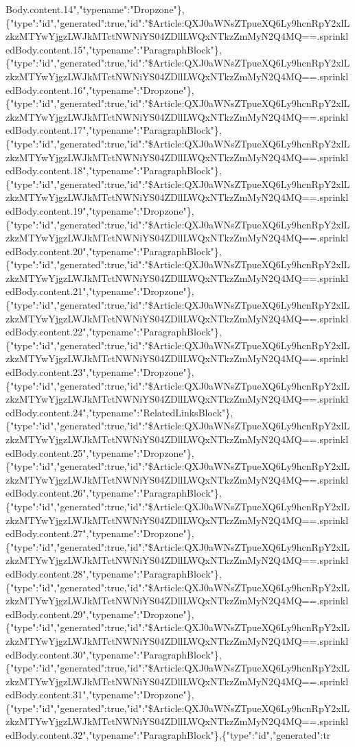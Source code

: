 Body.content.14","typename":"Dropzone"\},\{"type":"id","generated":true,"id":"\$Article:QXJ0aWNsZTpueXQ6Ly9hcnRpY2xlLzkzMTYwYjgzLWJkMTctNWNiYS04ZDllLWQxNTkzZmMyN2Q4MQ==.sprinkledBody.content.15","typename":"ParagraphBlock"\},\{"type":"id","generated":true,"id":"\$Article:QXJ0aWNsZTpueXQ6Ly9hcnRpY2xlLzkzMTYwYjgzLWJkMTctNWNiYS04ZDllLWQxNTkzZmMyN2Q4MQ==.sprinkledBody.content.16","typename":"Dropzone"\},\{"type":"id","generated":true,"id":"\$Article:QXJ0aWNsZTpueXQ6Ly9hcnRpY2xlLzkzMTYwYjgzLWJkMTctNWNiYS04ZDllLWQxNTkzZmMyN2Q4MQ==.sprinkledBody.content.17","typename":"ParagraphBlock"\},\{"type":"id","generated":true,"id":"\$Article:QXJ0aWNsZTpueXQ6Ly9hcnRpY2xlLzkzMTYwYjgzLWJkMTctNWNiYS04ZDllLWQxNTkzZmMyN2Q4MQ==.sprinkledBody.content.18","typename":"ParagraphBlock"\},\{"type":"id","generated":true,"id":"\$Article:QXJ0aWNsZTpueXQ6Ly9hcnRpY2xlLzkzMTYwYjgzLWJkMTctNWNiYS04ZDllLWQxNTkzZmMyN2Q4MQ==.sprinkledBody.content.19","typename":"Dropzone"\},\{"type":"id","generated":true,"id":"\$Article:QXJ0aWNsZTpueXQ6Ly9hcnRpY2xlLzkzMTYwYjgzLWJkMTctNWNiYS04ZDllLWQxNTkzZmMyN2Q4MQ==.sprinkledBody.content.20","typename":"ParagraphBlock"\},\{"type":"id","generated":true,"id":"\$Article:QXJ0aWNsZTpueXQ6Ly9hcnRpY2xlLzkzMTYwYjgzLWJkMTctNWNiYS04ZDllLWQxNTkzZmMyN2Q4MQ==.sprinkledBody.content.21","typename":"Dropzone"\},\{"type":"id","generated":true,"id":"\$Article:QXJ0aWNsZTpueXQ6Ly9hcnRpY2xlLzkzMTYwYjgzLWJkMTctNWNiYS04ZDllLWQxNTkzZmMyN2Q4MQ==.sprinkledBody.content.22","typename":"ParagraphBlock"\},\{"type":"id","generated":true,"id":"\$Article:QXJ0aWNsZTpueXQ6Ly9hcnRpY2xlLzkzMTYwYjgzLWJkMTctNWNiYS04ZDllLWQxNTkzZmMyN2Q4MQ==.sprinkledBody.content.23","typename":"Dropzone"\},\{"type":"id","generated":true,"id":"\$Article:QXJ0aWNsZTpueXQ6Ly9hcnRpY2xlLzkzMTYwYjgzLWJkMTctNWNiYS04ZDllLWQxNTkzZmMyN2Q4MQ==.sprinkledBody.content.24","typename":"RelatedLinksBlock"\},\{"type":"id","generated":true,"id":"\$Article:QXJ0aWNsZTpueXQ6Ly9hcnRpY2xlLzkzMTYwYjgzLWJkMTctNWNiYS04ZDllLWQxNTkzZmMyN2Q4MQ==.sprinkledBody.content.25","typename":"Dropzone"\},\{"type":"id","generated":true,"id":"\$Article:QXJ0aWNsZTpueXQ6Ly9hcnRpY2xlLzkzMTYwYjgzLWJkMTctNWNiYS04ZDllLWQxNTkzZmMyN2Q4MQ==.sprinkledBody.content.26","typename":"ParagraphBlock"\},\{"type":"id","generated":true,"id":"\$Article:QXJ0aWNsZTpueXQ6Ly9hcnRpY2xlLzkzMTYwYjgzLWJkMTctNWNiYS04ZDllLWQxNTkzZmMyN2Q4MQ==.sprinkledBody.content.27","typename":"Dropzone"\},\{"type":"id","generated":true,"id":"\$Article:QXJ0aWNsZTpueXQ6Ly9hcnRpY2xlLzkzMTYwYjgzLWJkMTctNWNiYS04ZDllLWQxNTkzZmMyN2Q4MQ==.sprinkledBody.content.28","typename":"ParagraphBlock"\},\{"type":"id","generated":true,"id":"\$Article:QXJ0aWNsZTpueXQ6Ly9hcnRpY2xlLzkzMTYwYjgzLWJkMTctNWNiYS04ZDllLWQxNTkzZmMyN2Q4MQ==.sprinkledBody.content.29","typename":"Dropzone"\},\{"type":"id","generated":true,"id":"\$Article:QXJ0aWNsZTpueXQ6Ly9hcnRpY2xlLzkzMTYwYjgzLWJkMTctNWNiYS04ZDllLWQxNTkzZmMyN2Q4MQ==.sprinkledBody.content.30","typename":"ParagraphBlock"\},\{"type":"id","generated":true,"id":"\$Article:QXJ0aWNsZTpueXQ6Ly9hcnRpY2xlLzkzMTYwYjgzLWJkMTctNWNiYS04ZDllLWQxNTkzZmMyN2Q4MQ==.sprinkledBody.content.31","typename":"Dropzone"\},\{"type":"id","generated":true,"id":"\$Article:QXJ0aWNsZTpueXQ6Ly9hcnRpY2xlLzkzMTYwYjgzLWJkMTctNWNiYS04ZDllLWQxNTkzZmMyN2Q4MQ==.sprinkledBody.content.32","typename":"ParagraphBlock"\},\{"type":"id","generated":tr